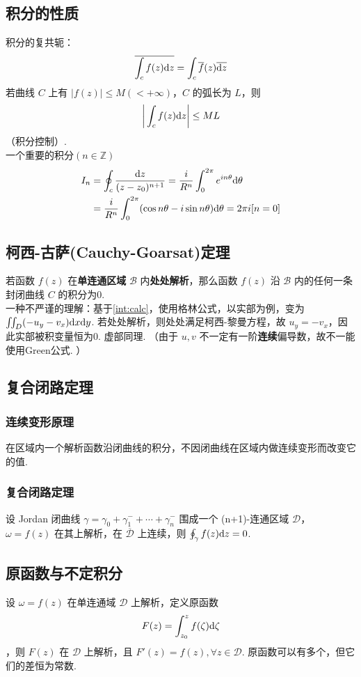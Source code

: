 \documentclass[./main.tex]{subfiles}
\begin{document}
\subsection{积分的性质}
积分的复共轭：
\begin{equation}
    \overline{\int_cf(z)\text{d}z}=\int_c\overline{f}(z)\overline{\text{d}z}
\end{equation}
若曲线 $C$ 上有 $\big|f(z)\big|\le M(<+\infty)$，$C$ 的弧长为 $L$，则 \begin{equation}\bigg|\int_cf(z)\text{d}z\bigg|\le ML\end{equation}（积分控制）. \\
\indent 一个重要的积分$(n\in\mathbb{Z})$
\begin{align}\label{equ:simpleint}
I_n&=\oint_c\frac{\text{d}z}{(z-z_0)^{n+1}}=\frac{i}{R^n}\int_0^{2\pi}e^{in\theta}\text{d}\theta\notag\\&=\frac{i}{R^n}\int_0^{2\pi}(\cos n\theta-i\sin n\theta)\text{d}\theta=2\pi i[n=0]
\end{align}
\subsection{柯西-古萨(Cauchy-Goarsat)定理}
若函数 $f(z)$ 在\textbf{单连通区域} $\mathscr{B}$ 内\textbf{处处解析}，那么函数 $f(z)$ 沿 $\mathscr{B}$ 内的任何一条封闭曲线 $C$ 的积分为0. \\
\indent 一种不严谨的理解：基于\eqref{int:calc}，使用格林公式，以实部为例，变为 $\iint_D(-u_y-v_x)\text{d}x\text{d}y$. 若处处解析，则处处满足柯西-黎曼方程，故 $u_y=-v_x$，因此实部被积变量恒为0. 虚部同理. （由于 $u,v$ 不一定有一阶\textbf{连续}偏导数，故不一能使用Green公式. ）
\subsection{复合闭路定理}
\subsubsection{连续变形原理}
在区域内一个解析函数沿闭曲线的积分，不因闭曲线在区域内做连续变形而改变它的值. 
\subsubsection{复合闭路定理}
设 Jordan 闭曲线 $\gamma=\gamma_0+\gamma_1^-+\cdots+\gamma_n^-$ 围成一个 (n+1)-连通区域 $\mathscr{D}$， $\omega=f(z)$ 在其上解析，在 $\overline{\mathscr{D}}$ 上连续，则 $\oint_{\gamma}f(z)\text{d}z=0$. 
\subsection{原函数与不定积分}
设 $\omega=f(z)$ 在单连通域 $\mathscr{D}$ 上解析，定义原函数 $$F(z)=\int_{z_0}^zf(\zeta)\text{d}\zeta$$，则 $F(z)$ 在 $\mathscr{D}$ 上解析，且 $F'(z)=f(z),\forall z\in \mathscr{D}$. 原函数可以有多个，但它们的差恒为常数. 
\end{document}
